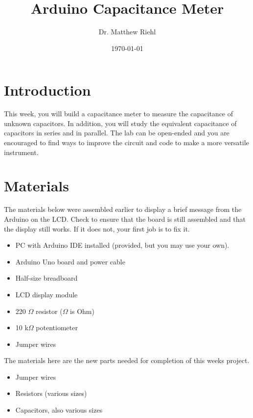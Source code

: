 \documentclass[]{article}
\title{Arduino Capacitance Meter}
\author{Dr. Matthew Riehl}
\date {\today}
\begin{document}
\newcommand{\ds}{\displaystyle}
\maketitle

\section{Introduction}

This week, you will build a capacitance meter  to measure the capacitance of unknown capacitors.  In addition, you will study the equivalent capacitance of capacitors in series and in parallel.  The lab can be open-ended and you are encouraged to find ways to improve the circuit and code to make a more versatile instrument.

\section{Materials}
The materials below were assembled earlier to display a brief message from the Arduino on the LCD.  Check to ensure that the board is still assembled and that the display still works.  If it does not, your first job is to fix it.
\begin{itemize}
	\item PC with Arduino IDE installed (provided, but you may use your own).
	\item Arduino Uno board and power cable
	\item Half-size breadboard
	\item LCD display module
	\item 220 $\Omega$ resistor ($\Omega$ is Ohm)
	\item 10 k$\Omega$ potentiometer
	\item Jumper wires
\end{itemize}
The materials here are the new parts needed for completion of this weeks project.
\begin{itemize}
	\item Jumper wires
	\item Resistors (various sizes)
	\item Capacitors, also various sizes
\end{itemize}
\end{document}
